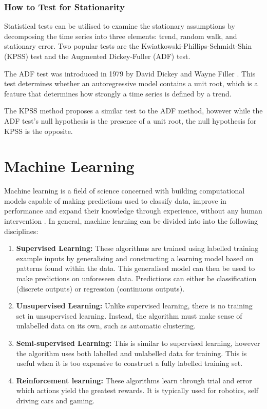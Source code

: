 \documentclass{UoYCSproject}
\begin{document}
\subsubsection{How to Test for Stationarity}
\label{subsec:testingstationarity}
Statistical tests can be utilised to examine the stationary assumptions by decomposing the time series into three elements: trend, random walk, and stationary error. Two popular tests are the Kwiatkowski-Phillips-Schmidt-Shin (KPSS) test and the Augmented Dickey-Fuller (ADF) test.

The ADF test was introduced in 1979 by David Dickey and Wayne Filler \cite{dickey1979distribution}. This test determines whether an autoregressive model contains a unit root, which is a feature that determines how strongly a time series is defined by a trend.

The KPSS method proposes a similar test to the ADF method, however while the ADF test's null hypothesis is the presence of a unit root, the null hypothesis for KPSS is the opposite. 

\section{Machine Learning}
Machine learning is a field of science concerned with building computational models capable of making predictions used to classify data, improve in performance and expand their knowledge through experience, without any human intervention \cite{mitchell1997}. 
In general, machine learning can be divided into into the following disciplines:

\begin{enumerate}
    \item \textbf{Supervised Learning:} These algorithms are trained using labelled training example inputs by generalising and constructing a learning model based on patterns found within the data. This generalised model can then be used to make predictions on unforeseen data. Predictions can either be classification (discrete outputs) or regression (continuous outputs). 
    
    \item \textbf{Unsupervised Learning:} Unlike supervised learning, there is no training set in unsupervised learning. Instead, the algorithm must make sense of unlabelled data on its own, such as automatic clustering.
    
    \item \textbf{Semi-supervised Learning:} This is similar to supervised learning, however the algorithm uses both labelled and unlabelled data for training. This is useful when it is too expensive to construct a fully labelled training set. 
    
    \item \textbf{Reinforcement learning:} These algorithms learn through trial and error which actions yield the greatest rewards. It is typically used for robotics, self driving cars and gaming.  
\end{enumerate}
\end{document}
